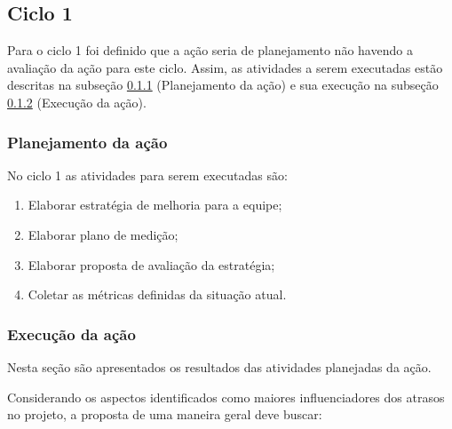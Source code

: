 \subsection{Ciclo 1}

	Para o ciclo 1 foi definido que a ação seria de planejamento não havendo a avaliação da ação para este ciclo. Assim, as atividades a serem
	executadas estão descritas na subseção \ref{sub:planejamento} (Planejamento da ação) e sua execução na subseção \ref{sub:execucao} (Execução da ação).

	\subsubsection{Planejamento da ação}
		\label{sub:planejamento}

		No ciclo 1 as atividades para serem executadas são:

		\begin{enumerate}

			\item Elaborar estratégia de melhoria para a equipe;

			\item Elaborar plano de medição;

			\item Elaborar proposta de avaliação da estratégia;

			\item Coletar as métricas definidas da situação atual.

		\end{enumerate}


	\subsubsection{Execução da ação}
	\label{sub:execucao}
  
	    Nesta seção são apresentados os resultados das atividades planejadas da ação.
	

		Considerando os aspectos identificados como maiores influenciadores dos atrasos no projeto,
		a proposta de uma maneira geral deve buscar:


